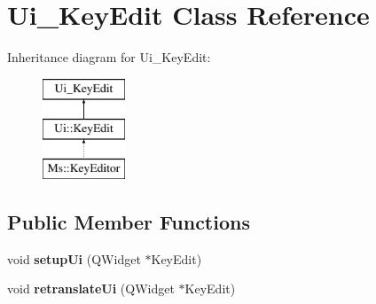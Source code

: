 \hypertarget{class_ui___key_edit}{}\section{Ui\+\_\+\+Key\+Edit Class Reference}
\label{class_ui___key_edit}
Inheritance diagram for Ui\+\_\+\+Key\+Edit\+:\begin{figure}[H]
\begin{center}
\leavevmode
\includegraphics[height=3.000000cm]{class_ui___key_edit}
\end{center}
\end{figure}
\subsection*{Public Member Functions}
\begin{DoxyCompactItemize}
\item 
\mbox{\label{class_ui___key_edit_ac64045a0af94b765034ee6d4545f9e56}} 
void {\bfseries setup\+Ui} (Q\+Widget $\ast$Key\+Edit)
\item 
\mbox{\label{class_ui___key_edit_a0e69a2e49fab2d9e989cf0053be0c114}} 
void {\bfseries retranslate\+Ui} (Q\+Widget $\ast$Key\+Edit)
\end{DoxyCompactItemize}
